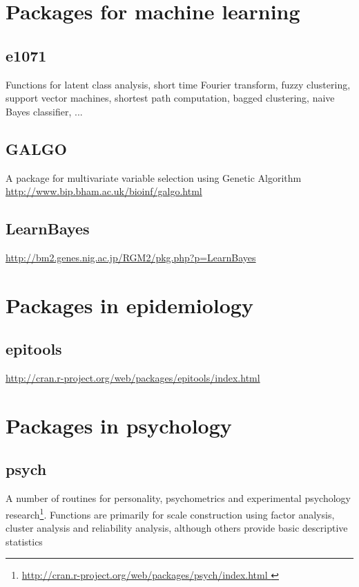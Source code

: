 \section{Packages for machine learning}
\label{sec:pack-mach-learn}

\subsection{e1071}
\label{sec:e1071}

Functions for latent class analysis, short time Fourier transform,
fuzzy clustering, support vector machines, shortest path computation,
bagged clustering, naive Bayes classifier, ...  
 
\subsection{GALGO}
\label{sec:galgo}

A package for multivariate variable selection using Genetic Algorithm
\url{http://www.bip.bham.ac.uk/bioinf/galgo.html }

\subsection{LearnBayes}
\label{sec:learnbayes}

\url{http://bm2.genes.nig.ac.jp/RGM2/pkg.php?p=LearnBayes}

\section{Packages in epidemiology}
\label{sec:pack-epid}

\subsection{epitools}
\label{sec:epitools}

\url{http://cran.r-project.org/web/packages/epitools/index.html}

\section{Packages in psychology}
\label{sec:packages-psychology}

\subsection{psych}
\label{sec:psych}


A number of routines for personality, psychometrics and experimental
psychology
research\footnote{\url{http://cran.r-project.org/web/packages/psych/index.html }}.
Functions are primarily for scale construction using factor analysis,
cluster analysis and reliability analysis, although others provide
basic descriptive statistics

